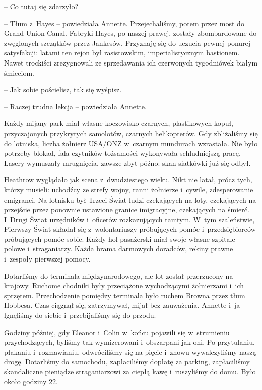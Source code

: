 \documentclass[oneside,polish,11pt,sfheadings]{mwbk}
\begin{document}
-- Co tutaj się zdarzyło?

-- Tłum z~Hayes -- powiedziała Annette. Przejechaliśmy, potem przez most
do Grand Union Canal. Fabryki Hayes, po naszej prawej, zostały
zbombardowane do zwęglonych szczątków przez Jankesów. Przyznaję się do
uczucia pewnej ponurej satysfakcji: latami ten rejon był rasistowskim,
imperialistycznym bastionem. Nawet trockiści zrezygnowali ze
sprzedawania ich czerwonych tygodniówek białym śmieciom.

-- Jak sobie pościelisz, tak się wyśpisz.

-- Raczej trudna lekcja -- powiedziała Annette.

Każdy mijany park miał własne koczowisko czarnych, plastikowych kopuł,
przyczajonych przykrytych samolotów, czarnych helikopterów. Gdy
zbliżaliśmy się do lotniska, liczba żołnierz USA/ONZ w~czarnym mundurach
wzrastała. Nie było potrzeby blokad, fala czytników tożsamości
wykonywała schludniejszą pracę. Lasery wymuszały mrugnięcia, zawsze zbyt
późno: skan siatkówki już się odbył.

Heathrow wyglądało jak scena z~dwudziestego wieku. Nikt nie latał, prócz
tych, którzy musieli: uchodźcy ze strefy wojny, ranni żołnierze i~cywile, zdesperowanie emigranci. Na lotnisku był Trzeci Świat ludzi
czekających na loty, czekających na przejście przez ponownie ustawione
granice imigracyjne, czekających na śmierć. I~Drugi Świat urzędników i~oficerów rozkazujących tamtym. W~tym szaleństwie, Pierwszy Świat składał
się z~wolontariuszy próbujących pomóc i~przedsiębiorców próbujących
pomóc sobie. Każdy hol pasażerski miał swoje własne szpitale polowe i~straganiarzy. Każda brama darmowych doradców, rekiny prawne i~zespoły
pierwszej pomocy.

Dotarliśmy do terminala międzynarodowego, ale lot został przerzucony na
krajowy. Ruchome chodniki były przeciążone wychodzącymi żołnierzami i~ich sprzętem. Przechodzenie pomiędzy terminala było ruchem Browna przez
tłum Hobbesa. Czas ciągnął się, zatrzymywał, mijał bez zauważenia.
Annette i~ja lgnęliśmy do siebie i~przebijaliśmy się do przodu.

Godziny później, gdy Eleanor i~Colin w~końcu pojawili się w~strumieniu
przychodzących, byliśmy tak wymizerowani i~obszarpani jak oni. Po
przytulaniu, płakaniu i~rozmawianiu, odwróciliśmy się na pięcie i~znowu
wywalczyliśmy naszą drogę. Dotarliśmy do samochodu, zapłaciliśmy dopłatę
za parking, zapłaciliśmy skandaliczne pieniądze straganiarzowi za ciepłą
kawę i~ruszyliśmy do domu. Było około godziny 22.
\end{document}

